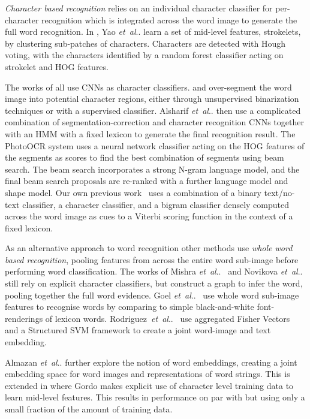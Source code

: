 \documentclass[twocolumn]{svjour3}          \smartqed  \usepackage{epsfig}
\makeatletter
\DeclareRobustCommand\onedot{\futurelet\@let@token\@onedot}
\def\@onedot{\ifx\@let@token.\else.\null\fi\xspace}
\def\etal{\emph{et~al}\onedot}
\makeatother
\begin{document}
\emph{Character based recognition} relies on an individual character classifier for per-character recognition which is integrated across the word image to generate the full word recognition. In \cite{Yao14}, Yao \etal learn a set of mid-level features, strokelets, by clustering sub-patches of characters. Characters are detected with Hough voting, with the characters identified by a random forest classifier acting on strokelet and HOG features. 

The works of \cite{Wang12,Jaderberg14a,Bissacco13,Alsharif13} all use CNNs as character classifiers. \cite{Bissacco13} and \cite{Alsharif13} over-segment the word image into potential character regions, either through unsupervised binarization techniques or with a supervised classifier. Alsharif \etal \cite{Alsharif13} then use a complicated combination of segmentation-correction and character recognition CNNs together with an HMM with a fixed lexicon to generate the final recognition result. The PhotoOCR system \cite{Bissacco13} uses a neural network classifier acting on the HOG features of the segments as scores to find the best combination of segments using beam search. The beam search incorporates a strong N-gram language model, and the final beam search proposals are re-ranked with a further language model and shape model. Our own previous work~\cite{Jaderberg14a} uses a combination of a binary text/no-text classifier, a character classifier, and a bigram classifier densely computed across the word image as cues to a Viterbi scoring function in the context of a fixed lexicon.

As an alternative approach to word recognition other methods use \emph{whole word based recognition}, pooling features from across the entire word sub-image before performing word classification. The works of Mishra \etal~\cite{Mishra12} and Novikova \etal~\cite{Novikova12} still
rely on explicit character classifiers, but construct a graph to infer
the word, pooling together the full word
evidence. Goel \etal~\cite{Goel13} use whole word sub-image features to recognise
words by comparing to simple black-and-white font-renderings of
lexicon words. Rodriguez~\etal~\cite{Rodriguez13} use aggregated Fisher
Vectors~\cite{Perronnin10} and a Structured SVM
framework to create a joint word-image and text
embedding.

Almazan \etal \cite{Almazan14} further explore the notion of word embeddings, creating a joint embedding space for word images and representations of word strings. This is extended in \cite{Gordo14} where Gordo makes explicit use of character level training data to learn mid-level features. This results in performance on par with \cite{Bissacco13} but using only a small fraction of the amount of training data. 
\end{document}
